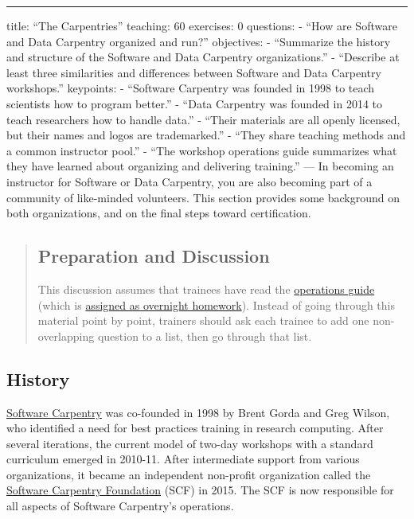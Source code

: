 \begin{center}
\rule{3in}{0.4pt}
\end{center}
title: ``The Carpentries''
teaching: 60
exercises: 0
questions:
- ``How are Software and Data Carpentry organized and run?''
objectives:
- ``Summarize the history and structure of the Software and Data Carpentry organizations.''
- ``Describe at least three similarities and differences between Software and Data Carpentry workshops.''
keypoints:
- ``Software Carpentry was founded in 1998 to teach scientists how to program better.''
- ``Data Carpentry was founded in 2014 to teach researchers how to handle data.''
- ``Their materials are all openly licensed, but their names and logos are trademarked.''
- ``They share teaching methods and a common instructor pool.''
- ``The workshop operations guide summarizes what they have learned about organizing and delivering training.''
---
In becoming an instructor for Software or Data Carpentry,
you are also becoming part of a community of like-minded volunteers.
This section provides some background on both organizations,
and on the final steps toward certification.

\begin{quotation}   %
\subsection*{Preparation and Discussion}

This discussion assumes that trainees have read the \href{\{\{ site.swc\_site \}\}/workshops/operations/}{operations guide}
(which is \href{\{\{ page.root \}\}/12-summarize/}{assigned as overnight homework}).
Instead of going through this material point by point,
trainers should ask each trainee to add one non-overlapping question to a list,
then go through that list.
\end{quotation}   %

\subsection*{History}

\href{\{\{ site.swc\_site \}\}}{Software Carpentry} was co-founded in 1998 by Brent Gorda and
Greg Wilson, who identified a need for best practices training in
research computing.  After several iterations, the current model of
two-day workshops with a standard curriculum emerged in 2010-11.
After intermediate support from various organizations, it became an
independent non-profit organization called the \href{\{\{ site.swc\_site \}\}/scf/}{Software Carpentry
Foundation} (SCF) in 2015.  The SCF is now responsible for all
aspects of Software Carpentry's operations.

